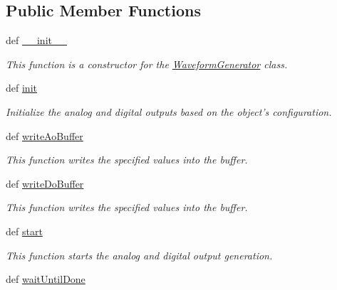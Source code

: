 \subsection*{Public Member Functions}
\begin{DoxyCompactItemize}
\item 
def \hyperlink{class_chassis_8git_1_1_waveform_generator_1_1_waveform_generator_a4237d6315f3c435fbfbc93cebd0e3aac}{\-\_\-\-\_\-init\-\_\-\-\_\-}
\begin{DoxyCompactList}\small\item\em This function is a constructor for the \hyperlink{class_chassis_8git_1_1_waveform_generator_1_1_waveform_generator}{Waveform\-Generator} class. \end{DoxyCompactList}\item 
def \hyperlink{class_chassis_8git_1_1_waveform_generator_1_1_waveform_generator_ab7419a7f3cc1ab46bdb06542544bd5fd}{init}
\begin{DoxyCompactList}\small\item\em Initialize the analog and digital outputs based on the object's configuration. \end{DoxyCompactList}\item 
def \hyperlink{class_chassis_8git_1_1_waveform_generator_1_1_waveform_generator_aaa148cebc35a97c045dbcdafcea65d81}{write\-Ao\-Buffer}
\begin{DoxyCompactList}\small\item\em This function writes the specified values into the buffer. \end{DoxyCompactList}\item 
def \hyperlink{class_chassis_8git_1_1_waveform_generator_1_1_waveform_generator_a7b9c28d677ec361ed400f2e6b5a42d86}{write\-Do\-Buffer}
\begin{DoxyCompactList}\small\item\em This function writes the specified values into the buffer. \end{DoxyCompactList}\item 
def \hyperlink{class_chassis_8git_1_1_waveform_generator_1_1_waveform_generator_af00e236e9959fe2f769889fb28e28255}{start}
\begin{DoxyCompactList}\small\item\em This function starts the analog and digital output generation. \end{DoxyCompactList}\item 
def \hyperlink{class_chassis_8git_1_1_waveform_generator_1_1_waveform_generator_a8defd8def0d6d078d4c3f9a0ffd18993}{wait\-Until\-Done}

\end{DoxyCompactItemize}
